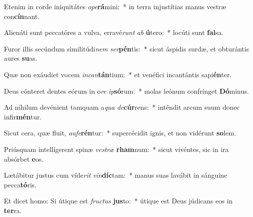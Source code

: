 \item Etenim in corde iniquitátes \textit{o}\textit{pe}\textbf{rá}mini:~* in terra injustítias manus vestræ con\textbf{cín}nant.
\item Alienáti sunt peccatóres a vulva, erravé\textit{runt} \textit{ab} \textbf{ú}tero:~* locúti sunt \textbf{fal}sa.
\item Furor illis secúndum similitúdi\textit{nem} \textit{ser}\textbf{pén}tis:~* sicut áspidis surdæ, et obturántis aures \textbf{su}as.
\item Quæ non exáudiet vocem \textit{in}\textit{can}\textbf{tán}tium:~* et venéfici incantántis sapi\textbf{én}ter.
\item Deus cónteret dentes eórum in o\textit{re} \textit{ip}\textbf{só}rum:~* molas leónum confrínget \textbf{Dó}minus.
\item Ad níhilum devénient tamquam a\textit{qua} \textit{de}\textbf{cúr}rens:~* inténdit arcum suum donec infir\textbf{mén}tur.
\item Sicut cera, quæ fluit, \textit{au}\textit{fe}\textbf{rén}tur:~* supercécidit ignis, et non vidérunt \textbf{so}lem.
\item Priúsquam intellígerent spinæ \textit{ves}\textit{træ} \textbf{rham}num:~* sicut vivéntes, sic in ira absórbet \textbf{e}os.
\item Lætábitur justus cum víde\textit{rit} \textit{vin}\textbf{díc}tam:~* manus suas lavábit in sánguine pecca\textbf{tó}ris.
\item Et dicet homo: Si útique est \textit{fruc}\textit{tus} \textbf{jus}to:~* útique est Deus júdicans eos in \textbf{ter}ra.
